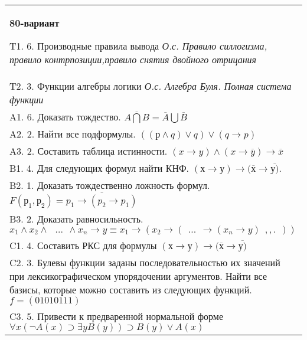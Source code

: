 \documentclass{article}
\begin{document}
\begin{tabular}{m{17cm}}
\textbf{80-вариант}
\newline

T1. 6. Производные правила вывода \emph{О.с. Правило силлогизма, правило контрпозиции,правило снятия двойного отрицания} \\
T2. 3. Функции алгебры логики \emph{О.с. Алгебра Буля. Полная система функции} \\
A1. 6. Доказать тождество. \(\overline{A\bigcap B} = \overline{A}\bigcup\overline{B}\) \\
A2. 2. Найти все подформулы. \(\left( (р \land q) \vee q \right) \vee (q \rightarrow p)\) \\
A3. 2. Составить таблица истинности. \((x \rightarrow y) \land (x \rightarrow \overline{y}) \rightarrow \overline{x}\) \\
B1. 4. Для следующих формул найти КНФ. \((х \rightarrow у) \rightarrow (\overline{х} \rightarrow \overline{у)}\). \\
B2. 1. Доказать тождественно ложность формул. \(F\left( р_{1},р_{2} \right) = \overline{p_{1} \rightarrow (p_{2} \rightarrow p_{1})}\) \\
B3. 2. Доказать равносильность.\(x_{1} \land x_{2} \land \ \ \ ...\ \  \land x_{n} \rightarrow y \equiv x_{1} \rightarrow (x_{2} \rightarrow (\ \ ...\ \  \rightarrow (x_{n} \rightarrow y)\ \ ,,.\ \ ))\) \\
C1. 4. Составить РКС для формулы \((х \rightarrow у) \rightarrow (\overline{х} \rightarrow \overline{у)}\) \\
C2. 3. Булевы функции заданы последовательностью их значений при лексикографическом упорядочении аргументов. Найти все базисы, которые можно составить из следующих функций. \(f = (01010111)\) \\
C3. 5. Привести к предваренной нормальной форме \(\forall x(\neg A(x) \supset \exists yB(y)) \supset B(y) \vee A(x)\) \\

\end{tabular}
\vspace{1cm}
\end{document}
